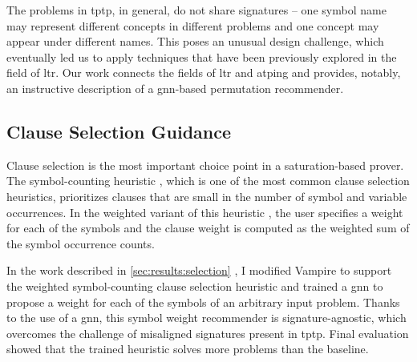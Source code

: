 
The problems in \gls{tptp}, in general, do not share \glspl{signature} -- one symbol name may represent different concepts in different problems and one concept may appear under different names.
This poses an unusual design challenge,
which eventually led us to apply techniques that have been previously explored in the field of \gls{ltr}.
Our work connects the fields of \gls{ltr} and \gls{atping} and provides, notably, an instructive description of a \acrshort{gnn}-based permutation recommender.

\subsection{Clause Selection Guidance}
\label{sec:contrib:ClauseSelection}


Clause selection is the most important choice point in a saturation-based prover.
The symbol-counting heuristic \cite{DBLP:conf/cade/SchulzM16}, which is one of the most common clause selection heuristics,
prioritizes clauses that are small in the number of symbol and variable occurrences.
In the weighted variant of this heuristic \cite{E-manual},
the user specifies a weight for each of the symbols
and
the clause weight is computed as the weighted sum of the symbol occurrence counts.

In the work described in \cref{sec:results:selection} \cite{DBLP:conf/lpar/Bartek023},
I modified Vampire to support the weighted symbol-counting clause selection heuristic
and trained a \gls{gnn} to propose a weight for each of the symbols of an arbitrary input problem.
Thanks to the use of a \gls{gnn}, this symbol weight recommender is signature-agnostic,
which overcomes the challenge of misaligned signatures present in \gls{tptp}.
Final evaluation showed that
the trained heuristic solves  more problems than the baseline.

